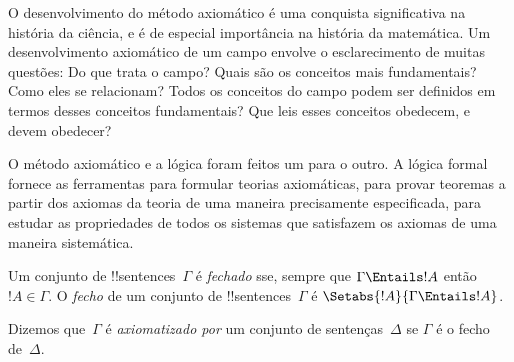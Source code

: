 \documentclass[../../../include/open-logic-section]{subfiles}
\begin{document}

\begin{explain}
O desenvolvimento do método axiomático é uma conquista significativa
na história da ciência, e é de especial importância na história
da matemática.  Um desenvolvimento axiomático de um campo envolve o
esclarecimento de muitas questões: Do que trata o campo?  Quais são os
conceitos mais fundamentais?  Como eles se relacionam?  Todos os
conceitos do campo podem ser definidos em termos desses conceitos
fundamentais?  Que leis esses conceitos obedecem, e devem obedecer?

O método axiomático e a lógica foram feitos um para o outro.  A lógica formal
fornece as ferramentas para formular teorias axiomáticas, para provar
teoremas a partir dos axiomas da teoria de uma maneira precisamente especificada,
para estudar as propriedades de todos os sistemas que satisfazem os axiomas de uma
maneira sistemática.
\end{explain}

\begin{defn}
Um conjunto de !!{sentence}s~$\Gamma$ é \emph{fechado} sse, sempre que
$\Gamma \Entails !A$ então $!A \in \Gamma$.  O \emph{fecho} de um conjunto
de !!{sentence}s~$\Gamma$ é $\Setabs{!A}{\Gamma \Entails !A}$.

Dizemos que~$\Gamma$ é \emph{axiomatizado por} um conjunto de
sentenças~$\Delta$ se $\Gamma$ é o fecho de~$\Delta$.
\end{defn}
\end{document}

